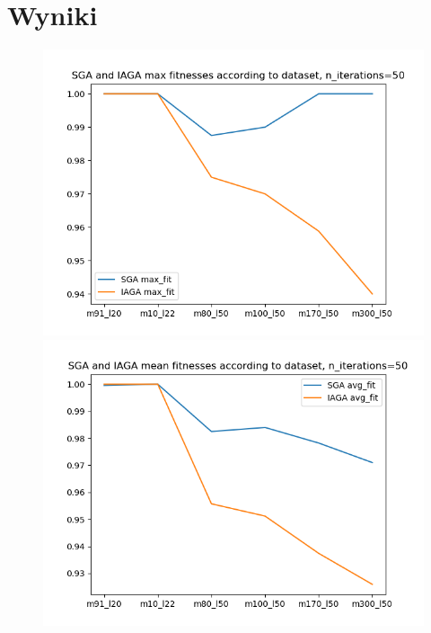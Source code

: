 \documentclass[10pt]{article}
\begin{document}
\section{Wyniki}
\begin{figure}[h]
\centering
\includegraphics[scale=0.50]{img/plot2.png}
\includegraphics[scale=0.50]{img/plot3.png}
\end{figure}
\end{document}
